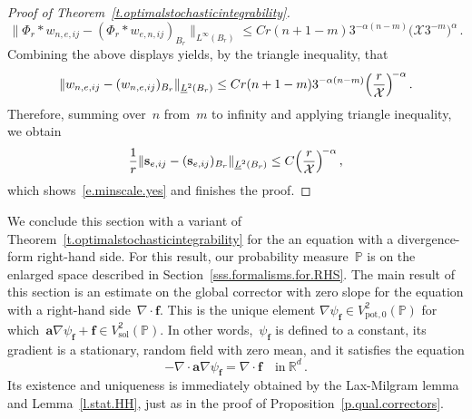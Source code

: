 \documentclass[11pt]{article} %
\numberwithin{equation}{section}
\theoremstyle{definition}
\newcommand*{\Rd}{\ensuremath{\mathbb{R}^d}}
\newcommand{\f}{\mathbf{f}}
\newcommand{\s}{\mathbf{s}}
\newcommand{\pot}{\mathrm{pot}}
\newcommand{\sol}{\mathrm{sol}}
\renewcommand{\a}{\mathbf{a}}
\renewcommand{\P}{\mathbb{P}}
\newcommand{\X}{\mathcal{X}}
\begin{document}
\begin{proof}[Proof of Theorem~\ref{t.optimalstochasticintegrability}]
\begin{equation*}
\bigl\| \Phi_r \ast w_{n,e,ij} - (\Phi_r \ast w_{e,n,ij})_{B_r}\bigr\|_{L^\infty(B_r)}  \leq C r (n +1 -m) 3^{-\alpha(n-m)} 
\bigl( \X 3^{-m} \bigr)^{\alpha} 
\,.
\end{equation*}
Combining the above displays yields, by the triangle inequality, that
\begin{equation*}  
\| w_{n,e,ij} - (w_{n,e,ij})_{B_r} \|_{\underline{L}^2(B_r)} 
\leq 
C r (n +1 -m) 3^{-\alpha(n-m)}  \Bigl( \frac{r}{\X} \Bigr)^{\!-\alpha} 
\,.
\end{equation*}
Therefore, summing over~$n$ from~$m$ to infinity and applying triangle inequality, we obtain
\begin{equation*}  
\frac1r \| \s_{e,ij} - (\s_{e,ij})_{B_r}\|_{\underline{L}^2(B_r)} \leq C \Bigl( \frac{r}{\X} \Bigr)^{\!-\alpha} \,,
\end{equation*}
which shows~\eqref{e.minscale.yes} and finishes the proof. 
\end{proof}


We conclude this section with a variant of~ Theorem~\ref{t.optimalstochasticintegrability} for the an equation with a divergence-form right-hand side. For this result, our probability measure~$\P$ is on the enlarged space described in Section~\ref{sss.formalisms.for.RHS}. 
The main result of this section is an estimate on the global corrector with zero slope for the equation with a right-hand side~$\nabla \cdot \f$.
This is the unique element $\nabla \psi_\f \in V^2_{\pot,0}(\P)$ for which~$\a \nabla \psi_\f  + \f \in V^2_\sol(\P)$. 
In other words,~$\psi_\f$ is defined to a constant, its gradient is a stationary, random field with zero mean, and it satisfies the equation
\begin{equation*}
-\nabla \cdot \a\nabla\psi_\f = \nabla\cdot \f \quad \mbox{in} \ \Rd\,.
\end{equation*}
Its existence and uniqueness is immediately obtained by the Lax-Milgram lemma and Lemma~\ref{l.stat.HH}, just as in the proof of Proposition~\ref{p.qual.correctors}. 
 
\end{document}
